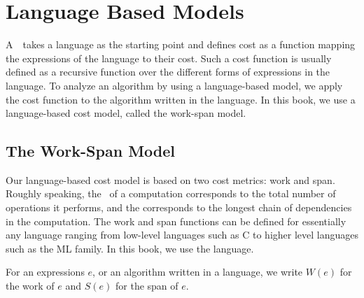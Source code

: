 \section{Language Based Models}
\label{sec:analysis::models::language}

\begin{gram}
A~~takes a language as the starting point
and defines cost as a function mapping the expressions of the language
to their cost.
%
Such a cost function is usually defined as a recursive function over
the different forms of expressions in the language.  
%
To analyze an algorithm by using a language-based model, we apply the
cost function to the algorithm written in the language.
%
In this book, we use a language-based cost model, called the work-span
model.
\end{gram}

\subsection{The Work-Span Model}
\label{sec:analysis::models::language:ws}

\begin{gram}
%
Our language-based cost model is based on two cost metrics: work and
span.  Roughly speaking, the~ of a computation corresponds to
the total number of operations it performs, and the  corresponds
to the longest chain of dependencies in the computation.
%
The work and span functions can be defined for essentially any
language ranging from low-level languages such as C to higher level
languages such as the ML family.  
%
In this book, we use the \PML{} language. 
\end{gram}



\begin{gram}
For an expressions $e$, or an algorithm written in a language, we write 
$W(e)$ for the work of $e$ and $S(e)$ for the span of $e$.
%
\end{gram}

